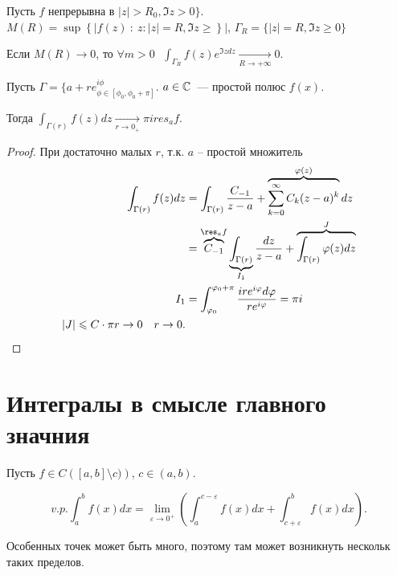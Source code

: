 \begin{lemma}
    [Жордана]
    Пусть $f$ непрерывна в $|z| > R_0, \Im z > 0 \}$.
    $M(R) = \sup\left\{ |f(z) ~:~ z : |z| = R, \Im z \geqslant \right\}|$, $\Gamma _R = \{ |z | = R, \Im z \geqslant 0\}$

    Если $M(R) \to 0$, то $\forall m > 0 ~~~\int_{\Gamma_R} f(z) e ^{\Im z dz} \underset{R \to +\infty}{\to} 0 $.

\end{lemma}

\begin{lemma}
    [О полувычите]

   Пусть $\Gamma = \{ a + r  e ^{i\phi } _{\phi \in [\phi_0, \phi_0 + \pi]}$.
   $a \in \mathbb{C}$~--- простой полюс $f(x)$.

   Тогда $\int_{\Gamma(r)} f (z) dz \underset{r \to 0_+}{\to} \pi i res_a f $.
\end{lemma}

\begin{proof}

    При достаточно малых $r$, т.к. $a$ -- простой множитель
    \begin{align*}
        \int_{\Gamma(r)} f(z)dz &= \int_{\Gamma(r)} \frac{C_{-1}}{z-a} + \overbrace{\sum_{k=0}^{\infty } C_k (z-a)^k}^{\varphi(z)} dz\\
        &= \overbrace{C_{-1}}^{\res_a f} \underbrace{\int_{\Gamma(r)}}_{I_1} \frac{dz}{z-a}  + \overbrace{\int_{\Gamma(r)}\varphi(z) dz}^{J}\\
        I_1 &= \int_{\varphi_0}^{\varphi_0 + \pi} \frac{ire^{i\varphi}d\varphi}{re^{i\varphi}} = \pi i \\
        |J| \leqslant C\cdot \pi r \to 0\quad r\to 0
    .\end{align*}
\end{proof}


\section{Интегралы в смысле главного значния}
Пусть $f \in C\left([a, b] \setminus c) \right)$, $c \in (a, b)$.

\[
v.p. \int_a^b f(x) dx  = \lim_{\varepsilon \to 0^+ } \left(
    \int_a^{c - \varepsilon} f(x) dx + \int_{c + \varepsilon}^b f(x)dx \right).
\]

Особенных точек может быть много, поэтому там может возникнуть нескольк таких пределов.

